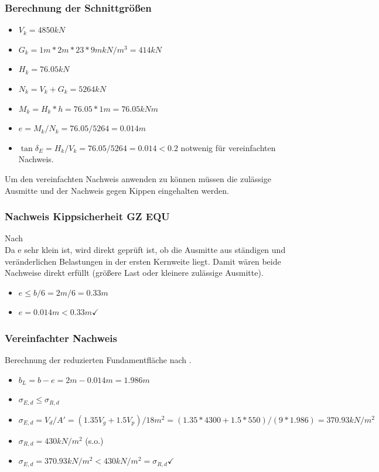 \documentclass[11pt,fleqn,a4paper,halfparskip]{article}
\begin{document}
\subsubsection{Berechnung der Schnittgrößen}
\begin{itemize}
\item[] $V_k = 4850kN$
\item[] $G_k = 1m*2m*23*9mkN/m^3 = 414kN$
\item[] $H_k = 76.05kN$
\item[] $N_k = V_k + G_k = 5264kN$
\item[] $M_k = H_k * h = 76.05*1m = 76.05kNm$
\item[] $e = M_k/N_k = 76.05/5264 = 0.014m$
\item[] $\tan\delta_E = H_k/V_k = 76.05/5264 = 0.014 < 0.2$ notwenig für vereinfachten Nachweis.
\end{itemize}
Um den vereinfachten Nachweis anwenden zu können müssen die zulässige Ausmitte und der Nachweis gegen Kippen eingehalten werden.
\subsubsection{Nachweis Kippsicherheit GZ EQU}
Nach \cite[S.97]{wsp}\\
Da e sehr klein ist, wird direkt geprüft ist, ob die Ausmitte aus ständigen und veränderlichen Belastungen in der ersten Kernweite liegt. Damit wären beide Nachweise direkt erfüllt (größere Last oder kleinere zulässige Ausmitte).
\begin{itemize}
\item[] $e \le b/6 = 2m/6 = 0.33m$
\item[] $e = 0.014m < 0.33m \checkmark$
\end{itemize}
\subsubsection{Vereinfachter Nachweis}
Berechnung der reduzierten Fundamentfläche nach \cite[S.108]{wsp}.
\begin{itemize}
\item[] $b_L = b - e = 2m-0.014m = 1.986m$
\item[] $\sigma_{E,d} \le \sigma_{R,d}$
\item[] $\sigma_{E,d} = V_d/A' = (1.35V_g + 1.5V_p) / 18m^2 = (1.35*4300 + 1.5*550)/(9*1.986) = 370.93kN/m^2$
\item[] $\sigma_{R,d} = 430kN/m^2$ (s.o.)
\item[] $\sigma_{E,d} = 370.93kN/m^2 < 430kN/m^2 = \sigma_{R,d}\checkmark$
\end{itemize}
\end{document}
